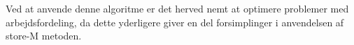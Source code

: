 \begin{eks}
\end{eks}

Ved at anvende denne algoritme er det herved nemt at optimere problemer med arbejdsfordeling, da dette yderligere giver en del forsimplinger i anvendelsen af store-M metoden. 
